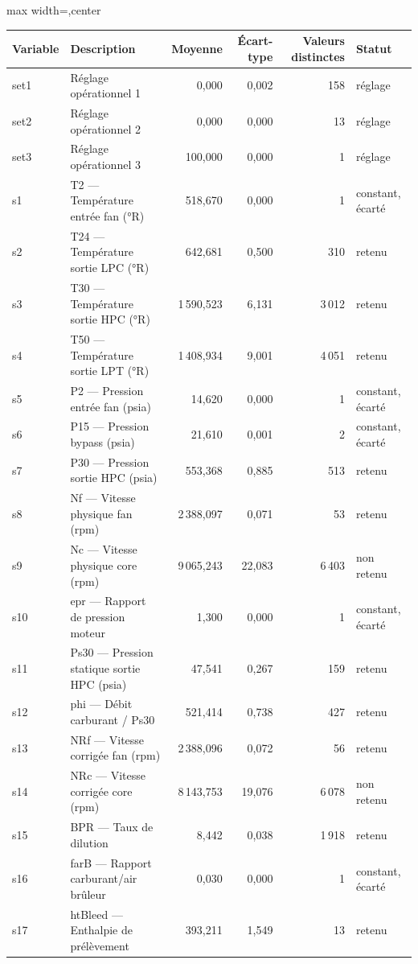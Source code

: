 \begin{table}[htbp]
\centering\small
\begin{adjustbox}{max width=\linewidth,center}
\begin{tabular}{llrrrl}
\toprule
Variable & Description & Moyenne & Écart-type & Valeurs distinctes & Statut \\
\midrule
set1 & Réglage opérationnel 1 & 0,000 & 0,002 & 158 & réglage \\
set2 & Réglage opérationnel 2 & 0,000 & 0,000 & 13 & réglage \\
set3 & Réglage opérationnel 3 & 100,000 & 0,000 & 1 & réglage \\
s1 & T2 — Température entrée fan (°R) & 518,670 & 0,000 & 1 & constant, écarté \\
s2 & T24 — Température sortie LPC (°R) & 642,681 & 0,500 & 310 & retenu \\
s3 & T30 — Température sortie HPC (°R) & 1\,590,523 & 6,131 & 3\,012 & retenu \\
s4 & T50 — Température sortie LPT (°R) & 1\,408,934 & 9,001 & 4\,051 & retenu \\
s5 & P2 — Pression entrée fan (psia) & 14,620 & 0,000 & 1 & constant, écarté \\
s6 & P15 — Pression bypass (psia) & 21,610 & 0,001 & 2 & constant, écarté \\
s7 & P30 — Pression sortie HPC (psia) & 553,368 & 0,885 & 513 & retenu \\
s8 & Nf — Vitesse physique fan (rpm) & 2\,388,097 & 0,071 & 53 & retenu \\
s9 & Nc — Vitesse physique core (rpm) & 9\,065,243 & 22,083 & 6\,403 & non retenu \\
s10 & epr — Rapport de pression moteur & 1,300 & 0,000 & 1 & constant, écarté \\
s11 & Ps30 — Pression statique sortie HPC (psia) & 47,541 & 0,267 & 159 & retenu \\
s12 & phi — Débit carburant / Ps30 & 521,414 & 0,738 & 427 & retenu \\
s13 & NRf — Vitesse corrigée fan (rpm) & 2\,388,096 & 0,072 & 56 & retenu \\
s14 & NRc — Vitesse corrigée core (rpm) & 8\,143,753 & 19,076 & 6\,078 & non retenu \\
s15 & BPR — Taux de dilution & 8,442 & 0,038 & 1\,918 & retenu \\
s16 & farB — Rapport carburant/air brûleur & 0,030 & 0,000 & 1 & constant, écarté \\
s17 & htBleed — Enthalpie de prélèvement & 393,211 & 1,549 & 13 & retenu \\

\end{tabular}
\end{adjustbox}
\end{table}
